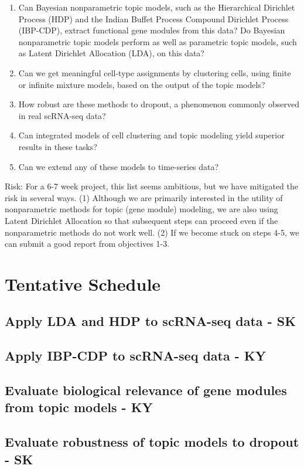 \documentclass[11pt]{article}
\begin{document}
\begin{enumerate}
    \item Can Bayesian nonparametric topic models, such as the Hierarchical Dirichlet Process (HDP) and the Indian Buffet Process Compound Dirichlet Process (IBP-CDP), extract functional gene modules from this data? Do Bayesian nonparametric topic models perform as well as parametric topic models, such as Latent Dirichlet Allocation (LDA), on this data?
    \item Can we get meaningful cell-type assignments by clustering cells, using finite or infinite mixture models, based on the output of the topic models?
    \item How robust are these methods to dropout, a phenomenon commonly observed in real scRNA-seq data?
    \item Can integrated models of cell clustering and topic modeling yield superior results in these tasks?
    \item Can we extend any of these models to time-series data?

\end{enumerate}

Risk: For a 6-7 week project, this list seems ambitious, but we have mitigated the risk in several ways. (1) Although we are primarily interested in the utility of nonparametric methods for topic (gene module) modeling, we are also using Latent Dirichlet Allocation so that subsequent steps can proceed even if the nonparametric methods do not work well. (2) If we become stuck on steps 4-5, we can submit a good report from objectives 1-3.

\section{Tentative Schedule}
\subsection{Apply LDA and HDP to scRNA-seq data - SK}
\subsection{Apply IBP-CDP to scRNA-seq data - KY}
\subsection{Evaluate biological relevance of gene modules from topic models - KY}
\subsection{Evaluate robustness of topic models to dropout - SK}
\end{document}
